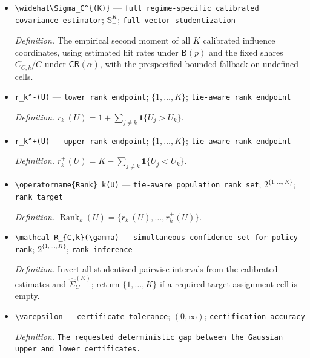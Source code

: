 \documentclass{article}
\begin{document}
\begin{itemize}
  \item \texttt{\textbackslash{}\allowbreak{}widehat\textbackslash{}\allowbreak{}Sigma\_\allowbreak{}C\textasciicircum{}\{(K)\}\allowbreak{}} --- \texttt{full regime-\allowbreak{}specific calibrated covariance estimator}; \(\mathbb S_+^K\); \texttt{full-\allowbreak{}vector studentization}
  \par\smallskip\noindent\emph{Definition.} The empirical second moment of all \(K\) calibrated influence coordinates, using estimated hit rates under \(\mathsf B(p)\) and the fixed shares \(C_{C,k}/C\) under \(\mathsf{CR}(\alpha)\), with the prespecified bounded fallback on undefined cells.
  \item \texttt{r\_\allowbreak{}k\textasciicircum{}-\allowbreak{}(U)} --- \texttt{lower rank endpoint}; \(\{1,\ldots,K\}\); \texttt{tie-\allowbreak{}aware rank endpoint}
  \par\smallskip\noindent\emph{Definition.} \(r_k^-(U)=1+\sum_{j\neq k}\mathbf 1\{U_j>U_k\}\).
  \item \texttt{r\_\allowbreak{}k\textasciicircum{}+\allowbreak{}(U)} --- \texttt{upper rank endpoint}; \(\{1,\ldots,K\}\); \texttt{tie-\allowbreak{}aware rank endpoint}
  \par\smallskip\noindent\emph{Definition.} \(r_k^+(U)=K-\sum_{j\neq k}\mathbf 1\{U_j<U_k\}\).
  \item \texttt{\textbackslash{}\allowbreak{}operatorname\{Rank\}\allowbreak{}\_\allowbreak{}k(U)} --- \texttt{tie-\allowbreak{}aware population rank set}; \(2^{\{1,\ldots,K\}}\); \texttt{rank target}
  \par\smallskip\noindent\emph{Definition.} \(\operatorname{Rank}_k(U)=\{r_k^-(U),\ldots,r_k^+(U)\}\).
  \item \texttt{\textbackslash{}\allowbreak{}mathcal R\_\allowbreak{}\{C,\allowbreak{}k\}\allowbreak{}(\textbackslash{}\allowbreak{}gamma)} --- \texttt{simultaneous confidence set for policy rank}; \(2^{\{1,\ldots,K\}}\); \texttt{rank inference}
  \par\smallskip\noindent\emph{Definition.} Invert all studentized pairwise intervals from the calibrated estimates and \(\widehat\Sigma_C^{(K)}\); return \(\{1,\ldots,K\}\) if a required target assignment cell is empty.
  \item \texttt{\textbackslash{}\allowbreak{}varepsilon} --- \texttt{certificate tolerance}; \((0,\infty)\); \texttt{certification accuracy}
  \par\smallskip\noindent\emph{Definition.} \texttt{The requested deterministic gap between the Gaussian upper and lower certificates.}

\end{itemize}
\end{document}
